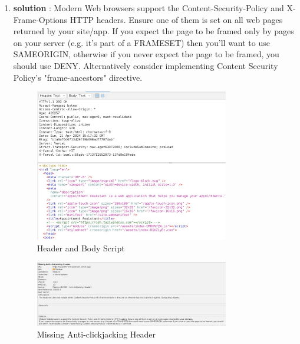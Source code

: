 \documentclass[openany]{report}
\begin{document}
\begin{enumerate}
    \item \textbf{solution} : Modern Web browsers support the Content-Security-Policy and X-Frame-Options HTTP headers. Ensure one of them is set on all web pages returned by your site/app. If you expect the page to be framed only by pages on your server (e.g. it's part of a FRAMESET) then you'll want to use SAMEORIGIN, otherwise if you never expect the page to be framed, you should use DENY. Alternatively consider implementing Content Security Policy's "frame-ancestors" directive.
          \begin{figure}[H]
              \centering
              \includegraphics[width=0.8\textwidth]{imgs/4.jpg}
              \caption{ Header and Body Script}
              \label{fig:my_label4}
          \end{figure}
          \begin{figure}[H]
              \centering
              \includegraphics[width=0.8\textwidth]{imgs/Medium3.jpg}
              \caption{Missing Anti-clickjacking Header}
              \label{fig:my_label6}
          \end{figure}
\end{enumerate}
\end{document}
